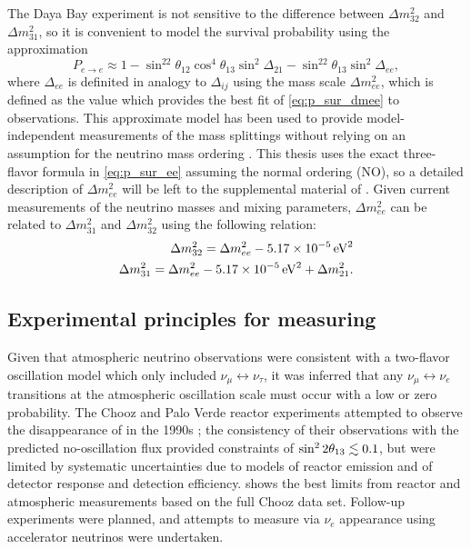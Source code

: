 The Daya Bay experiment is not sensitive
to the difference between $\Delta m^2_{32}$ and $\Delta m^2_{31}$,
so it is convenient to model the survival probability
using the approximation
\begin{equation}\label{eq:p_sur_dmee}
    P_{e\to e} \approx 1
    - \sin^22\theta_{12}\cos^4\theta_{13}\sin^2\Delta_{21}
    - \sin^22\theta_{13}\sin^2\Delta_{ee},
\end{equation}
where $\Delta_{ee}$ is definited in analogy to $\Delta_{ij}$
using the mass scale $\Delta m^2_{ee}$,
which is defined as the value which provides the best fit
of \cref{eq:p_sur_dmee} to observations.
This approximate model has been used to provide
model-independent measurements of the mass splittings
without relying on an assumption for the neutrino mass ordering
\cite{ngd2014,ngd2015,ngd2016,ngd2018}.
This thesis uses the exact three-flavor formula in \cref{eq:p_sur_ee}
assuming the normal ordering (NO),
so a detailed description of $\Delta m^2_{ee}$
will be left to the supplemental material of \cite{ngd2015}.
Given current measurements of the neutrino masses and mixing parameters,
$\Delta m^2_{ee}$ can be related to $\Delta m^2_{31}$ and $\Delta m^2_{32}$
using the following relation:
\begin{align}\label{eq:dmee_conversion}
    \begin{split}
        \Delta m^2_{32} = \dmee - \SI{5.17e-5}{\eV\squared} \\
        \Delta m^2_{31} = \dmee - \SI{5.17e-5}{\eV\squared} + \Delta m^2_{21}.
    \end{split}
\end{align}

\subsection{Experimental principles for measuring \texorpdfstring{\thetaot}{theta13}}
\label{subsec:theta13_experiments}

Given that atmospheric neutrino observations were consistent
with a two-flavor oscillation model which only included $\nu_\mu\leftrightarrow\nu_\tau$,
it was inferred that any $\nu_\mu\leftrightarrow\nu_e$ transitions
at the atmospheric oscillation scale
must occur with a low or zero probability.
The Chooz and Palo Verde reactor \nuebar{} experiments
attempted to observe the disappearance of \nuebar{} in the 1990s
\cite{chooz1999,paloverde2001};
the consistency of their observations with the predicted no-oscillation flux
provided constraints of $\sin^22\theta_{13} \lesssim 0.1$,
but were limited by systematic uncertainties
due to models of reactor \nuebar{} emission
and of detector response and detection efficiency.
 shows the best limits
from reactor and atmospheric measurements
based on the full Chooz data set.
Follow-up experiments were planned,
and attempts to measure \thetaot{} via $\nu_e$ appearance
using accelerator neutrinos were undertaken.

